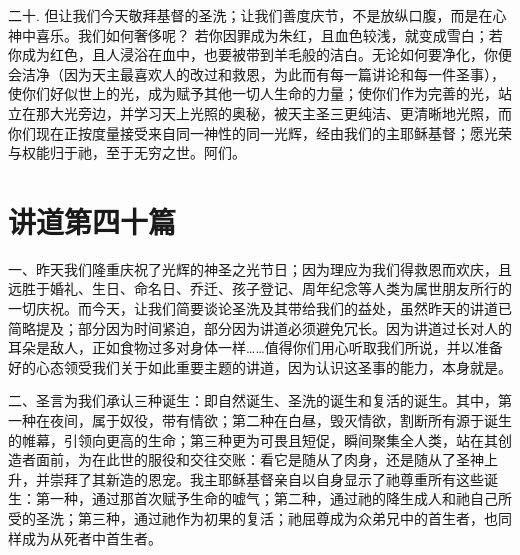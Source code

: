 二十. 但让我们今天敬拜基督的圣洗；让我们善度庆节，不是放纵口腹，而是在心神中喜乐。我们如何奢侈呢？ 若你因罪成为朱红，且血色较浅，就变成雪白；若你成为红色，且人浸浴在血中，也要被带到羊毛般的洁白。无论如何要净化，你便会洁净（因为天主最喜欢人的改过和救恩，为此而有每一篇讲论和每一件圣事），使你们好似世上的光，成为赋予其他一切人生命的力量；使你们作为完善的光，站立在那大光旁边，并学习天上光照的奥秘，被天主圣三更纯洁、更清晰地光照，而你们现在正按度量接受来自同一神性的同一光辉，经由我们的主耶稣基督；愿光荣与权能归于祂，至于无穷之世。阿们。\par



\section{讲道第四十篇}

\par

\par

一、昨天我们隆重庆祝了光辉的神圣之光节日；因为理应为我们得救恩而欢庆，且远胜于婚礼、生日、命名日、乔迁、孩子登记、周年纪念等人类为属世朋友所行的一切庆祝。而今天，让我们简要谈论圣洗及其带给我们的益处，虽然昨天的讲道已简略提及；部分因为时间紧迫，部分因为讲道必须避免冗长。因为讲道过长对人的耳朵是敌人，正如食物过多对身体一样……值得你们用心听取我们所说，并以准备好的心态领受我们关于如此重要主题的讲道，因为认识这圣事的能力，本身就是。\par

二、圣言为我们承认三种诞生：即自然诞生、圣洗的诞生和复活的诞生。其中，第一种在夜间，属于奴役，带有情欲；第二种在白昼，毁灭情欲，割断所有源于诞生的帷幕，引领向更高的生命；第三种更为可畏且短促，瞬间聚集全人类，站在其创造者面前，为在此世的服役和交往交账：看它是随从了肉身，还是随从了圣神上升，并崇拜了其新造的恩宠。我主耶稣基督亲自以自身显示了祂尊重所有这些诞生：第一种，通过那首次赋予生命的嘘气；第二种，通过祂的降生成人和祂自己所受的圣洗；第三种，通过祂作为初果的复活；祂屈尊成为众弟兄中的首生者，也同样成为从死者中首生者。\par

